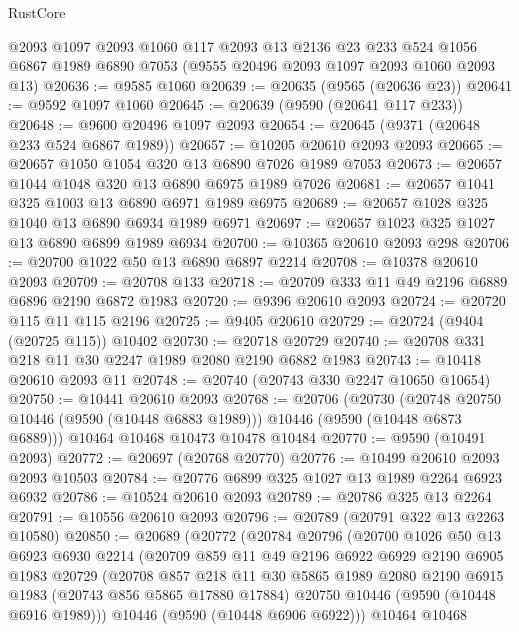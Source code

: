 \begin{lexlean}{RustCore}
\begin{coremodule}
    @2093
    @1097
    @2093
    @1060
    @117
    @2093
    @13
    @2136
    @23
    @233
    @524
    @1056
    @6867
    @1989
    @6890
    @7053
    (@9555 @20496 @2093 @1097 @2093 @1060 @2093 @13)
@20636 := @9585 @1060
@20639 := @20635 (@9565 (@20636 @23))
@20641 := @9592 @1097 @1060
@20645 := @20639 (@9590 (@20641 @117 @233))
@20648 := @9600 @20496 @1097 @2093
@20654 := @20645 (@9371 (@20648 @233 @524 @6867 @1989))
@20657 := @10205 @20610 @2093 @2093
@20665 := @20657 @1050 @1054 @320 @13 @6890 @7026 @1989 @7053
@20673 := @20657 @1044 @1048 @320 @13 @6890 @6975 @1989 @7026
@20681 := @20657 @1041 @325 @1003 @13 @6890 @6971 @1989 @6975
@20689 := @20657 @1028 @325 @1040 @13 @6890 @6934 @1989 @6971
@20697 := @20657 @1023 @325 @1027 @13 @6890 @6899 @1989 @6934
@20700 := @10365 @20610 @2093 @298
@20706 := @20700 @1022 @50 @13 @6890 @6897 @2214
@20708 := @10378 @20610 @2093
@20709 := @20708 @133
@20718 := @20709 @333 @11 @49 @2196 @6889 @6896 @2190 @6872 @1983
@20720 := @9396 @20610 @2093
@20724 := @20720 @115 @11 @115 @2196
@20725 := @9405 @20610
@20729 := @20724 (@9404 (@20725 @115)) @10402
@20730 := @20718 @20729
@20740 := @20708 @331 @218 @11 @30 @2247 @1989 @2080 @2190 @6882 @1983
@20743 := @10418 @20610 @2093 @11
@20748 := @20740 (@20743 @330 @2247 @10650 @10654)
@20750 := @10441 @20610 @2093
@20768 := @20706
    (@20730 (@20748 @20750 @10446 (@9590 (@10448 @6883 @1989))) @10446 (@9590 (@10448 @6873 @6889)))
    @10464
    @10468
    @10473
    @10478
    @10484
@20770 := @9590 (@10491 @2093)
@20772 := @20697 (@20768 @20770)
@20776 := @10499 @20610 @2093 @2093 @10503
@20784 := @20776 @6899 @325 @1027 @13 @1989 @2264 @6923 @6932
@20786 := @10524 @20610 @2093
@20789 := @20786 @325 @13 @2264
@20791 := @10556 @20610 @2093
@20796 := @20789 (@20791 @322 @13 @2263 @10580)
@20850 := @20689
    (@20772
      (@20784
        @20796
        (@20700
          @1026
          @50
          @13
          @6923
          @6930
          @2214
          (@20709
            @859
            @11
            @49
            @2196
            @6922
            @6929
            @2190
            @6905
            @1983
            @20729
            (@20708
              @857
              @218
              @11
              @30
              @5865
              @1989
              @2080
              @2190
              @6915
              @1983
              (@20743 @856 @5865 @17880 @17884)
              @20750
              @10446
              (@9590 (@10448 @6916 @1989)))
            @10446
            (@9590 (@10448 @6906 @6922)))
          @10464
          @10468

\end{coremodule}
\end{lexlean}

